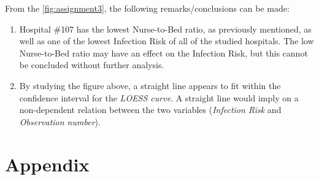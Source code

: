 \documentclass[11pt]{article}
\begin{document}
From the \autoref{fig:assignment3}, the following remarks/conclusions can be made:

\begin{enumerate}
\item
Hospital \#107 has the lowest Nurse-to-Bed ratio, as previously mentioned, as well as one of the lowest Infection Risk of all of the studied hospitals. The low Nurse-to-Bed ratio may have an effect on the Infection Risk, but this cannot be concluded without further analysis. 
\item
By studying the figure above, a straight line appears to fit within the confidence interval for the \textit{LOESS curve}. A straight line would imply on a non-dependent relation between the two variables (\textit{Infection Risk} and \textit{Observation number}).
\end{enumerate}


\newpage

\section*{Appendix}
\end{document}
